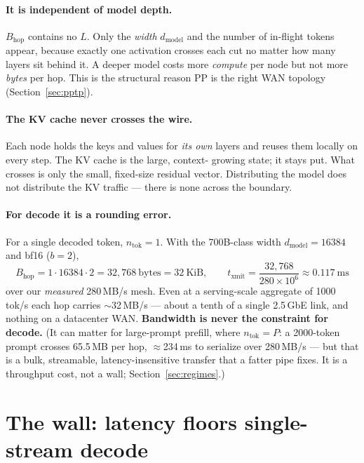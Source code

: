 \documentclass[11pt]{article}
\newcommand{\dmodel}{\ensuremath{d_{\mathrm{model}}}}
\begin{document}
\paragraph{It is independent of model depth.} $B_{\mathrm{hop}}$ contains no $L$. Only the
\emph{width} \dmodel{} and the number of in-flight tokens appear, because exactly one activation
crosses each cut no matter how many layers sit behind it. A deeper model costs more
\emph{compute} per node but not more \emph{bytes} per hop. This is the structural reason PP is the
right WAN topology (Section~\ref{sec:pptp}).

\paragraph{The KV cache never crosses the wire.} Each node holds the keys and values for
\emph{its own} layers and reuses them locally on every step. The KV cache is the large, context-
growing state; it stays put. What crosses is only the small, fixed-size residual vector. Distributing
the model does not distribute the KV traffic --- there is none across the boundary.

\paragraph{For decode it is a rounding error.} For a single decoded token, $n_{\mathrm{tok}}=1$.
With the 700B-class width $\dmodel=16384$ and bf16 ($b=2$),
\[
B_{\mathrm{hop}} = 1\cdot 16384 \cdot 2 = 32{,}768~\text{bytes} = 32~\text{KiB},
\qquad
t_{\mathrm{xmit}} = \frac{32{,}768}{280\times10^6} \approx 0.117~\text{ms}
\]
over our \emph{measured} 280\,MB/s mesh. Even at a serving-scale aggregate of 1000\,tok/s each hop
carries $\sim$32\,MB/s --- about a tenth of a single 2.5\,GbE link, and nothing on a datacenter WAN.
\textbf{Bandwidth is never the constraint for decode.} (It can matter for large-prompt prefill,
where $n_{\mathrm{tok}}=P$: a 2000-token prompt crosses 65.5\,MB per hop, $\approx$234\,ms to
serialize over 280\,MB/s --- but that is a bulk, streamable, latency-insensitive transfer that a
fatter pipe fixes. It is a throughput cost, not a wall; Section~\ref{sec:regimes}.)

\section{The wall: latency floors single-stream decode}
\label{sec:wall}
\end{document}
